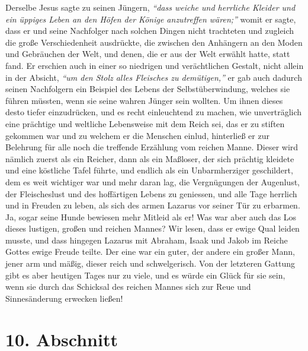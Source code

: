 Derselbe Jesus sagte
zu seinen Jüngern,
\textit{"`dass weiche und herrliche Kleider und ein üppiges Leben an
den Höfen der Könige anzutreffen wären;"'}
womit er sagte,
dass er und seine Nachfolger nach solchen Dingen nicht trachteten und zugleich
die große Verschiedenheit ausdrückte, die zwischen den Anhängern an den Moden
und Gebräuchen der Welt, und denen, die er aus der Welt erwählt hatte, statt
fand. Er erschien auch in einer so niedrigen und verächtlichen Gestalt, nicht
allein in der Absicht,
\textit{"`um den Stolz alles Fleisches zu demütigen,"'} er gab
auch dadurch seinen Nachfolgern ein Beispiel des Lebens der
Selbstüberwindung,
welches sie führen müssten, wenn sie seine wahren Jünger sein wollten. Um ihnen
dieses desto tiefer einzudrücken, und es recht einleuchtend zu machen, wie
unverträglich eine prächtige und weltliche Lebensweise mit dem Reich sei, das
er zu stiften gekommen war und zu welchem er die Menschen einlud, hinterließ
er zur Belehrung für alle noch die treffende Erzählung vom reichen
Manne.
Dieser wird nämlich zuerst als ein Reicher, dann als
ein Maßloser, der sich
prächtig
kleidete und eine köstliche Tafel führte, und
endlich als ein Unbarmherziger geschildert, dem es weit wichtiger war und mehr
daran lag, die Vergnügungen der Augenlust, der Fleischeslust und des hoffärtigen
Lebens zu geniessen, und alle Tage herrlich und in Freuden zu leben, als sich
des
armen Lazarus vor seiner Tür zu erbarmen. Ja, sogar
seine Hunde
bewiesen mehr
Mitleid als er! Was war aber auch das Los dieses lustigen, großen
und reichen
Mannes? Wir lesen, dass er ewige Qual leiden musste, und dass
hingegen Lazarus mit
Abraham, Isaak und
Jakob
im Reiche Gottes ewige Freude teilte. Der eine war ein
guter, der andere ein großer Mann, jener arm und mäßig, dieser reich und
schwelgerisch. Von der letzteren Gattung gibt es aber heutigen Tages nur zu
viele, und es würde ein Glück für sie sein, wenn sie durch das Schicksal des
reichen Mannes sich zur Reue und Sinnesänderung erwecken ließen!

\section{10. Abschnitt} \label{kap14_ab10}

